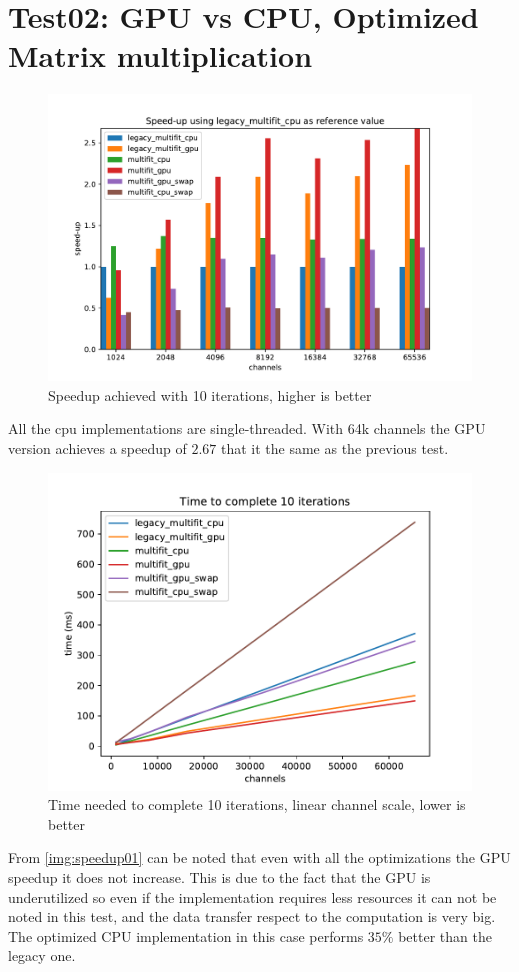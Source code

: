 \section{Test02: GPU vs CPU, Optimized Matrix multiplication}

\begin{figure}[h]
  \includegraphics[width=\textwidth]{img/speedup02}
  \caption{Speedup achieved with 10 iterations, higher is better}
  \label{img:speedup02}
\end{figure}
All the cpu implementations are single-threaded. With 64k channels the GPU version achieves a speedup of $2.67$ that it the same as the previous test.
\begin{figure}[H]
  \includegraphics[width=.75\textwidth]{img/linscale02}
  \caption{Time needed to complete 10 iterations, linear channel scale, lower is better}
  \label{img:linscale02}
\end{figure}
From \ref{img:speedup01} can be noted that even with all the optimizations the GPU speedup it does not increase. This is due to the fact that the GPU is underutilized so even if the implementation requires less resources it can not be noted in this test, and the data transfer respect to the computation is very big. The optimized CPU implementation in this case performs $35\%$ better than the legacy one.
